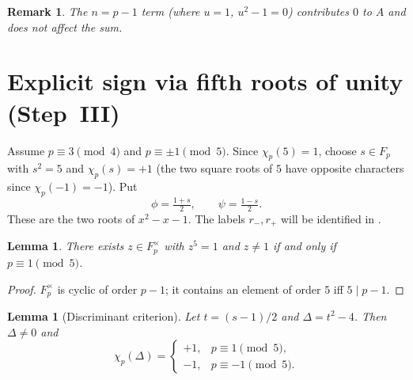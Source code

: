 \documentclass[preprint,5p,times,twocolumn]{elsarticle}
\def\F{F}\def\Z{Z}\def\Q{Q}\def\R{R}\def\N{N}%
\newtheorem{lemma}[theorem]{Lemma}
\newtheorem{remark}[theorem]{Remark}
\newcommand{\Z}{\mathbb{Z}}
\newcommand{\Q}{\mathbb{Q}}
\newcommand{\R}{\mathbb{R}}
\newcommand{\F}{\mathbb{F}}
\newcommand{\N}{\mathbb{N}}
\begin{document}
\begin{remark}
The $n=p-1$ term (where $u=1$, $u^2-1=0$) contributes $0$ to 
$A$ and does not affect the sum.
\end{remark}

\section{Explicit sign via fifth roots of unity (Step~III)}
\label{sec:sign}

Assume $p\equiv 3\pmod 4$ and $p\equiv\pm 1\pmod 5$. Since 
$\chi_p(5)=1$, choose $s\in\F_p$ with $s^2=5$ and 
$\chi_p(s)=+1$ (the two square roots of $5$ have opposite 
characters since $\chi_p(-1)=-1$). Put
\[
\phi=\tfrac{1+s}{2},\qquad \psi=\tfrac{1-s}{2}.
\]
These are the two roots of $x^2-x-1$. The labels $r_-,r_+$ 
will be identified in .

\begin{lemma}\label{lem:R0}
There exists $z\in\F_p^\times$ with $z^5=1$ and $z\ne 1$ if 
and only if $p\equiv 1\pmod 5$.
\end{lemma}

\begin{proof}
$\F_p^\times$ is cyclic of order $p-1$; it contains an element 
of order $5$ iff $5\mid p-1$.
\end{proof}

\begin{lemma}[Discriminant criterion]\label{lem:R2}
Let $t=(s-1)/2$ and $\Delta=t^2-4$. Then $\Delta\ne0$ and
\[
\chi_p(\Delta)=
\begin{cases}+1,& p\equiv 1\pmod 5,\\
              -1,& p\equiv -1\pmod 5.\end{cases}
\]
\end{lemma}
\end{document}
